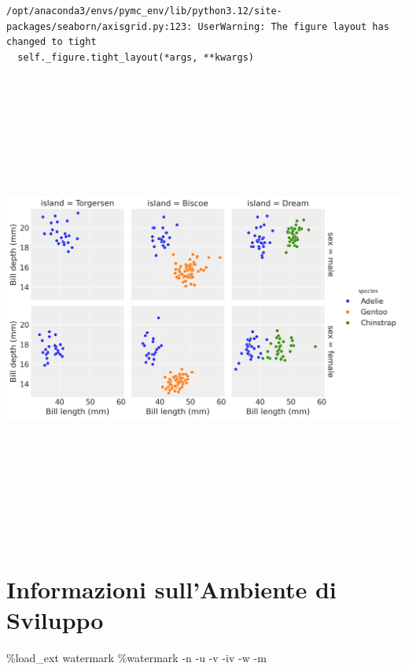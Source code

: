 \documentclass[
  letterpaper,
  krantz2]{{[}./krantz{]}}
\newenvironment{Shaded}{\begin{snugshade}}{\end{snugshade}}
\newcommand{\NormalTok}[1]{\textcolor[rgb]{0.00,0.23,0.31}{#1}}
\newcommand{\OperatorTok}[1]{\textcolor[rgb]{0.37,0.37,0.37}{#1}}
\begin{document}
\begin{verbatim}
/opt/anaconda3/envs/pymc_env/lib/python3.12/site-packages/seaborn/axisgrid.py:123: UserWarning: The figure layout has changed to tight
  self._figure.tight_layout(*args, **kwargs)
\end{verbatim}

\includegraphics[width=10.89583in,height=6.13542in]{chapters/python/08_seaborn_files/figure-pdf/cell-12-output-2.png}

\section{Informazioni sull'Ambiente di
Sviluppo}\label{informazioni-sullambiente-di-sviluppo-7}

\begin{Shaded}
\begin{Highlighting}[]
\OperatorTok{\%}\NormalTok{load\_ext watermark}
\OperatorTok{\%}\NormalTok{watermark }\OperatorTok{{-}}\NormalTok{n }\OperatorTok{{-}}\NormalTok{u }\OperatorTok{{-}}\NormalTok{v }\OperatorTok{{-}}\NormalTok{iv }\OperatorTok{{-}}\NormalTok{w }\OperatorTok{{-}}\NormalTok{m}
\end{Highlighting}
\end{Shaded}
\end{document}
